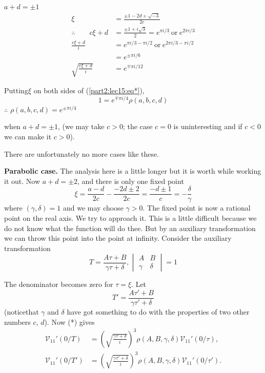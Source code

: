 \begin{case}\label{part2:lec15:case2}
  $a+d=\pm 1$
  \begin{align*}
    \xi & = \frac{\pm 1 - 2d+ \sqrt{-3}}{2c}\\
    \therefore \qquad c \xi + d & = \frac{\pm 1+ i \sqrt{3}}{2}=
    e^{\pi i /3} ~\text{or}~ e^{2 \pi i /3}\\
    \frac{c \xi+d}{i} & = e^{\pi i /3- \pi i /2} ~\text{or}~ e^{2 \pi
      i /3 - \pi i /2}\\
    & = e^{\pm \pi i /6}\\
    \sqrt{\frac{c \xi +d}{i}} & = e^{\mp \pi i /12}
  \end{align*}
\end{case}

Putting\pageoriginale $\xi$ on both sides of (\ref{part2:lec15:eq*}), 
$$
1= e^{\mp \pi i /4} \rho (a, b, c, d)
$$
$\therefore$ \hspace{2cm} $\rho (a, b,c, d)= e^{\pm \pi i /4}$

when $a+d= \pm 1$, (we may take $c>0$; the case $c=0$ is uninteresting
and if $c<0$ we can make it $c>0$).

There are unfortunately no more cases like these.

\noindent \textbf{Parabolic case.} The analysis here is a little
longer but it is worth while working it out. Now $a+d= \pm 2$, and
there is only one fixed point
$$
\xi= \frac{a-d}{2c} - \frac{- 2d\pm 2}{2c} = \frac{- d \pm 1}{c} = -
\frac \delta \gamma
$$
where $(\gamma, \delta)=1$ and we may choose $\gamma>0$. The fixed
point is now a rational point on the real axis. We try to approach
it. This is a little difficult because we do not know what the
function will do thee. But by an auxiliary transformation we can throw
this point into the point at infinity. Consider the auxiliary
transformation
$$
T= \frac{A \tau + B}{\gamma \tau + \delta}, 
\begin{vmatrix} A & B\\ \gamma &\delta \end{vmatrix}=1
$$

The denominator becomes zero for $\tau = \xi$. Let
$$
T'= \frac{A \tau' + B}{\gamma \tau' + \delta}
$$
(notice\pageoriginale that $\gamma$ and $\delta$ have got something
to do with the properties of two other numbers $c$, $d$). Now (*)
gives
\begin{align*}
  \mathscr{V}_{11}'(0/T) & = \left(\sqrt{\frac{\gamma \tau + \delta}{i}}
  \right)^3 \rho (A, B, \gamma, \delta) \mathscr{V}_{11}' (0/ \tau),\\
  \mathscr{V}_{11}' (0/T') & = \left(\sqrt{\frac{\gamma \tau' + \delta}{i}}
  \right)^3 \rho (A, B, \gamma, \delta) \mathscr{V}_{11}' (0/ \tau').  
\end{align*}


